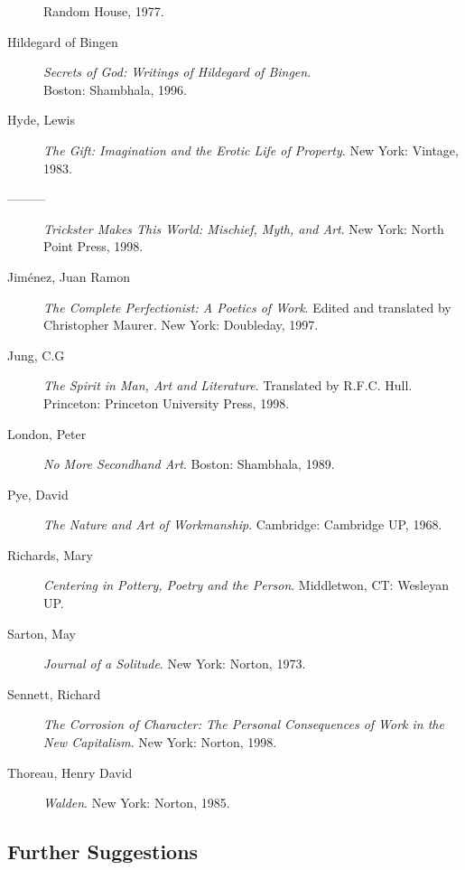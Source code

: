 \documentclass[letterpaper,10pt,headsepline]{scrreprt}
\begin{document}
\begin{description}
  Random House, 1977.
\item [Hildegard of Bingen] \textit{Secrets of God: Writings of
    Hildegard of Bingen}.\\ Boston: Shambhala, 1996.
\item [Hyde, Lewis] \textit{The Gift: Imagination and the Erotic Life
    of Property}. New York: Vintage, 1983.
\item [---------] \textit{Trickster Makes This World: Mischief, Myth,
    and Art}. New York: North Point Press, 1998.
\item [Jim\'enez, Juan Ramon] \textit{The Complete Perfectionist: A
    Poetics of Work}. Edited and translated by Christopher Maurer. New
  York: Doubleday, 1997.
\item [Jung, C.G] \textit{The Spirit in Man, Art and Literature}.
  Translated by R.F.C. Hull. Princeton: Princeton University Press,
  1998.
\item [London, Peter] \textit{No More Secondhand Art}. Boston:
  Shambhala, 1989.
\item [Pye, David] \textit{The Nature and Art of Workmanship}.
  Cambridge: Cambridge UP, 1968.
\item [Richards, Mary] \textit{Centering in Pottery, Poetry and the
    Person}. Middletwon, CT: Wesleyan UP.
\item [Sarton, May] \textit{Journal of a Solitude}. New York: Norton,
  1973.
\item [Sennett, Richard] \textit{The Corrosion of Character: The
    Personal Consequences of Work in the New Capitalism}. New York:
  Norton, 1998.
\item [Thoreau, Henry David] \textit{Walden}. New York: Norton, 1985.
\end{description}
\newpage

\subsection{Further Suggestions}
\end{document}
